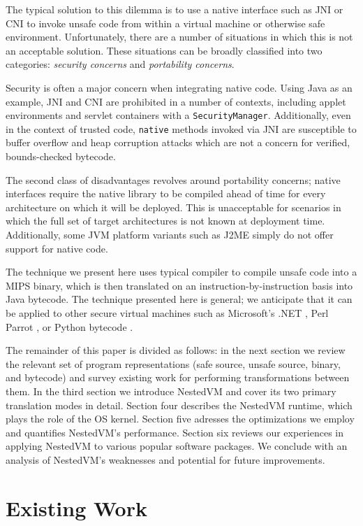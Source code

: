 \documentclass{acmconf}
\begin{document}
The typical solution to this dilemma is to use a native interface such
as JNI \cite{jni} or CNI \cite{cni} to invoke unsafe code from within a
virtual machine or otherwise safe environment.  Unfortunately, there
are a number of situations in which this is not an acceptable
solution.  These situations can be broadly classified into two
categories: {\it security concerns} and {\it portability concerns}.

Security is often a major concern when integrating native code.  Using
Java as an example, JNI and CNI are prohibited in a number of
contexts, including applet environments and servlet containers with a
{\tt SecurityManager}.  Additionally, even in the context of trusted
code, {\tt native} methods invoked via JNI are susceptible to buffer
overflow and heap corruption attacks which are not a concern for
verified, bounds-checked bytecode.

The second class of disadvantages revolves around portability
concerns; native interfaces require the native library to be compiled
ahead of time for every architecture on which it will be deployed.
This is unacceptable for scenarios in which the full set of target
architectures is not known at deployment time.  Additionally, some JVM
platform variants such as J2ME \cite{j2me} simply do not offer support
for native code.

The technique we present here uses typical compiler to compile unsafe
code into a MIPS binary, which is then translated on an
instruction-by-instruction basis into Java bytecode.  The technique
presented here is general; we anticipate that it can be applied to
other secure virtual machines such as Microsoft's .NET \cite{msil},
Perl Parrot \cite{parrot}, or Python bytecode \cite{python}.

The remainder of this paper is divided as follows: in the next section
we review the relevant set of program representations (safe source,
unsafe source, binary, and bytecode) and survey existing work for
performing transformations between them.  In the third section we
introduce NestedVM and cover its two primary translation modes in
detail.  Section four describes the NestedVM runtime, which plays the
role of the OS kernel.  Section five adresses the optimizations we
employ and quantifies NestedVM's performance.  Section six reviews our
experiences in applying NestedVM to various popular software packages.
We conclude with an analysis of NestedVM's weaknesses and potential
for future improvements.


\section{Existing Work}
\end{document}
